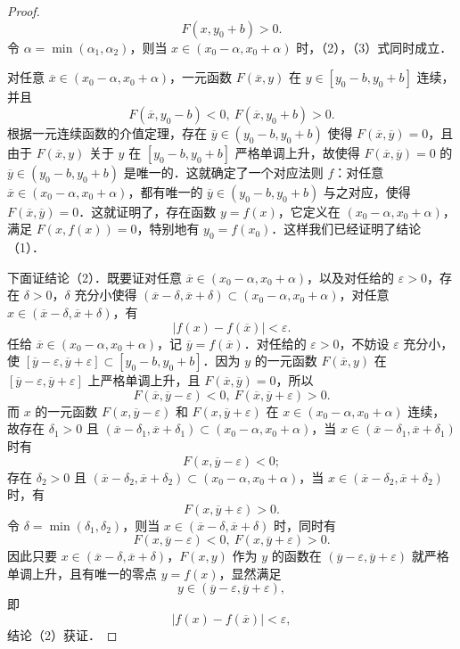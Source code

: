 \begin{proof}
\begin{equation}
F(x,y_{0}+b)>0.
\tag{3}
\end{equation}
令 $\alpha=\min(\alpha_{1},\alpha_{2})$，则当 $x\in(x_{0}-\alpha,x_{0}+\alpha)$ 时，（2），（3）式同时成立．

对任意 $\overline{x}\in(x_{0}-\alpha,x_{0}+\alpha)$，一元函数 $F(\overline{x},y)$ 在 $y\in[y_{0}-b,y_{0}+b]$ 连续，并且
\[
F(\overline{x},y_{0}-b)<0,\ F(\overline{x},y_{0}+b)>0.
\]
根据一元连续函数的介值定理，存在 $\overline{y}\in(y_{0}-b,y_{0}+b)$ 使得 $F(\overline{x},\overline{y})=0$，且由于 $F(\overline{x},y)$ 关于 $y$ 在 $[y_{0}-b,y_{0}+b]$ 严格单调上升，故使得 $F(\overline{x},\overline{y})=0$ 的 $\overline{y}\in(y_{0}-b,y_{0}+b)$ 是唯一的．这就确定了一个对应法则 $f$：对任意 $\overline{x}\in(x_{0}-\alpha,x_{0}+\alpha)$，都有唯一的 $\overline{y}\in(y_{0}-b,y_{0}+b)$ 与之对应，使得 $F(\overline{x},\overline{y})=0$．这就证明了，存在函数 $y=f(x)$，它定义在 $(x_{0}-\alpha,x_{0}+\alpha)$，满足 $F(x,f(x))=0$，特别地有 $y_{0}=f(x_{0})$．这样我们已经证明了结论（1）．

下面证结论（2）．既要证对任意 $\overline{x}\in(x_{0}-\alpha,x_{0}+\alpha)$，以及对任给的 $\varepsilon>0$，存在 $\delta>0$，$\delta$ 充分小使得 $(\overline{x}-\delta,\overline{x}+\delta)\subset(x_{0}-\alpha,x_{0}+\alpha)$，对任意 $x\in(\overline{x}-\delta,\overline{x}+\delta)$，有
\[
\left|f(x)-f(\overline{x})\right|<\varepsilon.
\]
任给 $\overline{x}\in(x_{0}-\alpha,x_{0}+\alpha)$，记 $\overline{y}=f(\overline{x})$．对任给的 $\varepsilon>0$，不妨设 $\varepsilon$ 充分小，使 $[\overline{y}-\varepsilon,\overline{y}+\varepsilon]\subset[y_{0}-b,y_{0}+b]$．因为 $y$ 的一元函数 $F(\overline{x},y)$ 在 $[\overline{y}-\varepsilon,\overline{y}+\varepsilon]$ 上严格单调上升，且 $F(\overline{x},\overline{y})=0$，所以
\[
F(\overline{x},\overline{y}-\varepsilon)<0,\ F(\overline{x},\overline{y}+\varepsilon)>0.
\]
而 $x$ 的一元函数 $F(x,\overline{y}-\varepsilon)$ 和 $F(x,\overline{y}+\varepsilon)$ 在 $x\in(x_{0}-\alpha,x_{0}+\alpha)$ 连续，故存在 $\delta_{1}>0$ 且 $(\overline{x}-\delta_{1},\overline{x}+\delta_{1})\subset(x_{0}-\alpha,x_{0}+\alpha)$，当 $x\in(\overline{x}-\delta_{1},\overline{x}+\delta_{1})$ 时有
\[
F(x,\overline{y}-\varepsilon)<0;
\]
存在 $\delta_{2}>0$ 且 $(\overline{x}-\delta_{2},\overline{x}+\delta_{2})\subset(x_{0}-\alpha,x_{0}+\alpha)$，当 $x\in(\overline{x}-\delta_{2},\overline{x}+\delta_{2})$ 时，有
\[
F(x,\overline{y}+\varepsilon)>0.
\]
令 $\delta=\min(\delta_{1},\delta_{2})$，则当 $x\in(\overline{x}-\delta,\overline{x}+\delta)$ 时，同时有
\[
F(x,\overline{y}-\varepsilon)<0,\ F(x,\overline{y}+\varepsilon)>0.
\]
因此只要 $x\in(\overline{x}-\delta,\overline{x}+\delta)$，$F(x,y)$ 作为 $y$ 的函数在 $(\overline{y}-\varepsilon,\overline{y}+\varepsilon)$ 就严格单调上升，且有唯一的零点 $y=f(x)$，显然满足
\[
y\in(\overline{y}-\varepsilon,\overline{y}+\varepsilon),
\]
即
\[
\left|f(x)-f(\overline{x})\right|<\varepsilon,
\]
结论（2）获证．


\end{proof}
